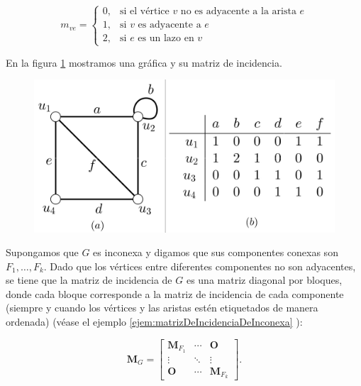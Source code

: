 $$ m_{ve}=
\begin{cases}
0, & \text{si el vértice } v \text{ no es adyacente a la arista } e \\ 
1, & \text{si } v \text{ es adyacente a } e\\ 
2, & \text{si } e \text{ es un lazo en } v
\end{cases}
$$

En la figura \ref{fig:matrizdeincidencia} mostramos una gráfica y su matriz de incidencia.

\begin{figure}[H]
    \centering
    \includegraphics[scale=0.25]{img/imgchapter1/matrizdeincidencia.jpg}
    \caption{}
    \label{fig:matrizdeincidencia}
\end{figure}

Supongamos que $G$ es inconexa y digamos que sus componentes conexas son $F_{1}, \ldots, F_{k}$. Dado que los vértices entre diferentes componentes no son adyacentes, se tiene que la matriz de incidencia de $G$ es una matriz diagonal por bloques, donde cada bloque corresponde a la matriz de incidencia de cada componente (siempre y cuando los vértices y las aristas estén etiquetados de manera ordenada) (véase el ejemplo \ref{ejem:matrizDeIncidenciaDeInconexa} ):

$$
\mathbf{M}_{G}=\begin{bmatrix}
\mathbf{M}_{F_{1}} & \cdots  & \mathbf{O}\\ 
\vdots & \ddots & \vdots\\ 
\mathbf{O} & \cdots & \mathbf{M}_{F_{k}}
\end{bmatrix}.
$$

